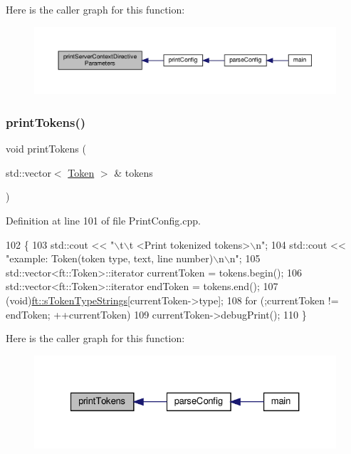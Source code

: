 Here is the caller graph for this function\+:
\nopagebreak
\begin{figure}[H]
\begin{center}
\leavevmode
\includegraphics[width=350pt]{classft_1_1_print_config_a5f88f0aae9e0678e2637ae329b74739e_icgraph}
\end{center}
\end{figure}
\mbox{\label{classft_1_1_print_config_aecc55315a253587bb0a987bd086ca39b}} 
\subsubsection{\texorpdfstring{print\+Tokens()}{printTokens()}}
{\footnotesize\ttfamily void print\+Tokens (\begin{DoxyParamCaption}\item[{std\+::vector$<$ \hyperlink{classft_1_1_token}{Token} $>$ \&}]{tokens }\end{DoxyParamCaption})\hspace{0.3cm}{\ttfamily [static]}}



Definition at line 101 of file Print\+Config.\+cpp.


\begin{DoxyCode}
102     \{
103         std::cout << \textcolor{stringliteral}{"\(\backslash\)t\(\backslash\)t <Print tokenized tokens>\(\backslash\)n"};
104         std::cout << \textcolor{stringliteral}{"example: Token(token type, text, line number)\(\backslash\)n\(\backslash\)n"};
105         std::vector<ft::Token>::iterator    currentToken = tokens.begin();
106         std::vector<ft::Token>::iterator    endToken = tokens.end();
107         (void)\hyperlink{namespaceft_a1b9b00bc284da71346729142b8560e03}{ft::sTokenTypeStrings}[currentToken->type];
108         for (;currentToken != endToken; ++currentToken)
109             currentToken->debugPrint();
110     \}
\end{DoxyCode}
Here is the caller graph for this function\+:
\nopagebreak
\begin{figure}[H]
\begin{center}
\leavevmode
\includegraphics[width=327pt]{classft_1_1_print_config_aecc55315a253587bb0a987bd086ca39b_icgraph}
\end{center}
\end{figure}


